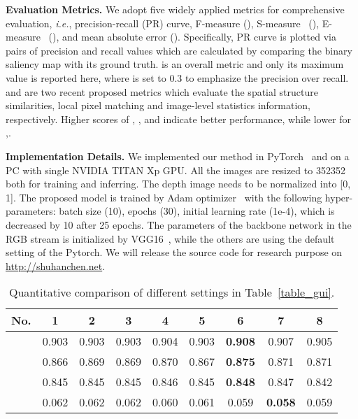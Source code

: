 \documentclass[runningheads]{llncs}
\begin{document}
\textbf{Evaluation Metrics.}
We adopt five widely applied metrics for comprehensive evaluation, \textit{i.e.}, precision-recall (PR) curve, F-measure (), S-measure~\cite{fan2017structure} (), E-measure~\cite{fan2018enhanced} (), and mean absolute error (). Specifically, PR curve is plotted via pairs of precision and recall values which are calculated by comparing the binary saliency map with its ground truth.  is an overall metric and only its maximum value is reported here, where  is set to 0.3 to emphasize the precision over recall.  and  are two recent proposed metrics which evaluate the spatial structure similarities, local pixel matching and image-level statistics information, respectively. Higher scores of , , and  indicate better performance, while lower for ,.

\textbf{Implementation Details.}
We implemented our method in PyTorch~\cite{paszke2019pytorch} and on a PC with single NVIDIA TITAN Xp GPU. All the images are resized to 352352 both for training and inferring. The depth image needs to be normalized into [0, 1]. The proposed model is trained by Adam optimizer~\cite{kingma2015adam} with the following hyper-parameters: batch size (10), epochs (30), initial learning rate (1e-4), which is decreased by 10 after 25 epochs. The parameters of the backbone network in the RGB stream is initialized by VGG16~\cite{simonyan2015very}, while the others are using the default setting of the Pytorch. We will release the source code for research purpose on \url{http://shuhanchen.net}.

\setlength{\tabcolsep}{6pt}
\begin{table}[]
\begin{center}
\caption{Quantitative comparison of different settings in Table~\ref{table_gui}.}
\label{table_gs}
\begin{tabular}{ccccccccc}
\hline
\hline
No.  & 1   & 2   & 3   & 4   & 5   & 6   & 7 & 8  \\ \hline
 & 0.903 & 0.903 & 0.903 & 0.904 & 0.903 & \textbf{0.908} & 0.907 & 0.905 \\
 & 0.866 & 0.869 & 0.869 & 0.870 & 0.867 & \textbf{0.875} & 0.871 & 0.871 \\
 & 0.845 & 0.845 & 0.845 & 0.846 & 0.845 & \textbf{0.848} & 0.847 & 0.842 \\
 & 0.062 & 0.062 & 0.062 & 0.060 & 0.061 & 0.059 & \textbf{0.058} & 0.059 \\ \hline
\hline
\end{tabular}
\end{center}
\end{table}
\setlength{\tabcolsep}{1.6pt}
\end{document}
